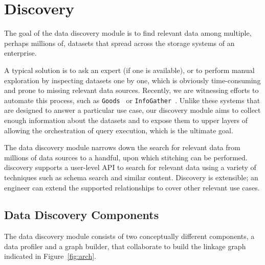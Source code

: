 \section{Discovery}
\label{sec:discovery}

The goal of the data discovery module is to find relevant data among multiple,
perhaps millions of, datasets that spread across the storage systems of an
enterprise.

A typical solution is to ask an expert (if one is available), or to perform
manual exploration by inspecting datasets one by one, which is obviously
time-consuming and prone to missing relevant data sources.  Recently, we are
witnessing efforts to automate this process, such as
\texttt{Goods}~\cite{DBLP:conf/sigmod/HalevyKNOPRW16} or
\texttt{InfoGather}~\cite{ref}. Unlike these systems
that are designed to answer a particular use case, our discovery module aims to
collect enough information about the datasets and to expose them to upper layers
of \dcv allowing the orchestration of query execution, which is the ultimate
goal.

The data discovery module narrows down the search for relevant data from
millions of data sources to a handful, upon which stitching can be performed.
\dcv discovery supports a user-level API to search for relevant data using a
variety of techniques such as schema search and similar content. Discovery is
extensible; an engineer can extend the supported relationships to cover other
relevant use cases.

\subsection{Data Discovery Components}

The data discovery module consists of two conceptually different components, a
data profiler and a graph builder, that collaborate to build the linkage graph
indicated in Figure~\ref{fig:arch}. 


